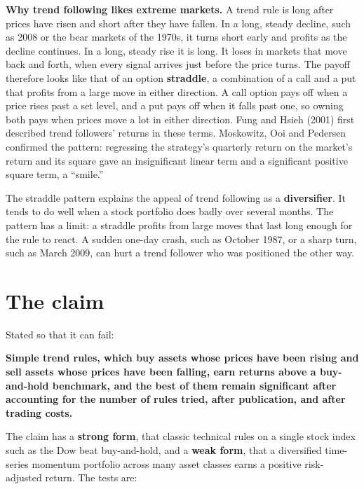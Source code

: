 \textbf{Why trend following likes extreme markets.} A trend rule is long after prices have risen and short after they have fallen. In a long, steady decline, such as 2008 or the bear markets of the 1970s, it turns short early and profits as the decline continues. In a long, steady rise it is long. It loses in markets that move back and forth, when every signal arrives just before the price turns. The payoff therefore looks like that of an option \textbf{straddle}, a combination of a call and a put that profits from a large move in either direction. A call option pays off when a price rises past a set level, and a put pays off when it falls past one, so owning both pays when prices move a lot in either direction. Fung and Hsieh (2001) first described trend followers' returns in these terms. Moskowitz, Ooi and Pedersen confirmed the pattern: regressing the strategy's quarterly return on the market's return and its square gave an insignificant linear term and a significant positive square term, a ``smile.''

The straddle pattern explains the appeal of trend following as a \textbf{diversifier}. It tends to do well when a stock portfolio does badly over several months. The pattern has a limit: a straddle profits from large moves that last long enough for the rule to react. A sudden one-day crash, such as October 1987, or a sharp turn, such as March 2009, can hurt a trend follower who was positioned the other way.


\section{The claim}
\label{sec:08-claim}

Stated so that it can fail:

\begin{callout}
\textbf{Simple trend rules, which buy assets whose prices have been rising and sell assets whose prices have been falling, earn returns above a buy-and-hold benchmark, and the best of them remain significant after accounting for the number of rules tried, after publication, and after trading costs.}
\end{callout}

The claim has a \textbf{strong form}, that classic technical rules on a single stock index such as the Dow beat buy-and-hold, and a \textbf{weak form}, that a diversified time-series momentum portfolio across many asset classes earns a positive risk-adjusted return. The tests are:

